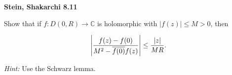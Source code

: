 \textbf{Stein, Shakarchi 8.11}

Show that if $f : D(0, R) \to \mathbb{C}$ is holomorphic with $|f(z)| \leq M > 0$, then

$$
\left| \frac{f(z) - f(0)}{M^2 - \overline{f(0)} f(z)} \right| \le \frac{|z|}{MR}.
$$

\textit{Hint: } Use the Schwarz lemma.

\begin{solution}
  \ \\
\end{solution}
